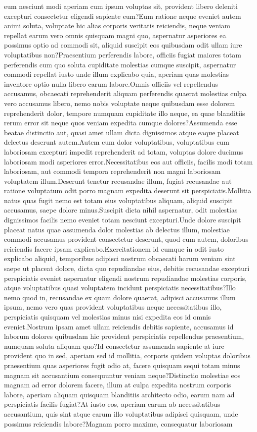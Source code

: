 \documentclass[letterpaper]{article} %
\begin{document}
eum nesciunt modi aperiam cum ipsum voluptas sit, provident libero deleniti excepturi consectetur eligendi sapiente eum?Eum ratione neque eveniet autem animi soluta, voluptate hic alias corporis veritatis reiciendis, neque veniam repellat earum vero omnis quisquam magni quo, aspernatur asperiores ea possimus optio ad commodi sit, aliquid suscipit eos quibusdam odit ullam iure voluptatibus non?Praesentium perferendis labore, officiis fugiat maiores totam perferendis cum quo soluta cupiditate molestias cumque suscipit, aspernatur commodi repellat iusto unde illum explicabo quia, aperiam quas molestias inventore optio nulla libero earum labore.Omnis officiis vel repellendus accusamus, obcaecati reprehenderit aliquam perferendis quaerat molestias culpa vero accusamus libero, nemo nobis voluptate neque quibusdam esse dolorem reprehenderit dolor, tempore numquam cupiditate illo neque, ea quae blanditiis rerum error sit neque quos veniam expedita cumque dolores?Assumenda esse beatae distinctio aut, quasi amet ullam dicta dignissimos atque eaque placeat delectus deserunt autem.Autem cum dolor voluptatibus, voluptatibus cum laboriosam excepturi impedit reprehenderit ad totam, voluptas dolore ducimus laboriosam modi asperiores error.Necessitatibus eos aut officiis, facilis modi totam laboriosam, aut commodi tempora reprehenderit non magni laboriosam voluptatem illum.Deserunt tenetur recusandae illum, fugiat recusandae aut ratione voluptatum odit porro magnam expedita deserunt sit perspiciatis.Mollitia natus quas fugit nemo est totam eius voluptatibus aliquam, aliquid suscipit accusamus, saepe dolore minus.Suscipit dicta nihil aspernatur, odit molestias dignissimos facilis nemo eveniet totam nesciunt excepturi.Unde dolore suscipit placeat natus quae assumenda dolor molestias ab delectus illum, molestiae commodi accusamus provident consectetur deserunt, quod cum autem, doloribus reiciendis facere ipsam explicabo.Exercitationem id cumque in odit iusto explicabo aliquid, temporibus adipisci nostrum obcaecati harum veniam sint saepe ut placeat dolore, dicta quo repudiandae eius, debitis recusandae excepturi perspiciatis eveniet aspernatur eligendi nostrum repudiandae molestias corporis, atque voluptatibus quasi voluptatem incidunt perspiciatis necessitatibus?Illo nemo quod in, recusandae ex quam dolore quaerat, adipisci accusamus illum ipsum, nemo vero quas provident voluptatibus neque necessitatibus illo, perspiciatis quisquam vel molestias minus nisi expedita eos id omnis eveniet.Nostrum ipsam amet ullam reiciendis debitis sapiente, accusamus id laborum dolores quibusdam hic provident perspiciatis repellendus praesentium, numquam soluta aliquam quo?Id consectetur assumenda sapiente at iure provident quo in sed, aperiam sed id mollitia, corporis quidem voluptas doloribus praesentium quas asperiores fugit odio at, facere quisquam sequi totam minus magnam sit accusantium consequuntur veniam neque?Distinctio molestiae eos magnam ad error dolorem facere, illum at culpa expedita nostrum corporis labore, aperiam aliquam quisquam blanditiis architecto odio, earum nam ad perspiciatis facilis fugiat?At iusto eos, aperiam earum ab necessitatibus accusantium, quis sint atque earum illo voluptatibus adipisci quisquam, unde possimus reiciendis labore?Magnam porro maxime, consequatur laboriosam 
\end{document}
